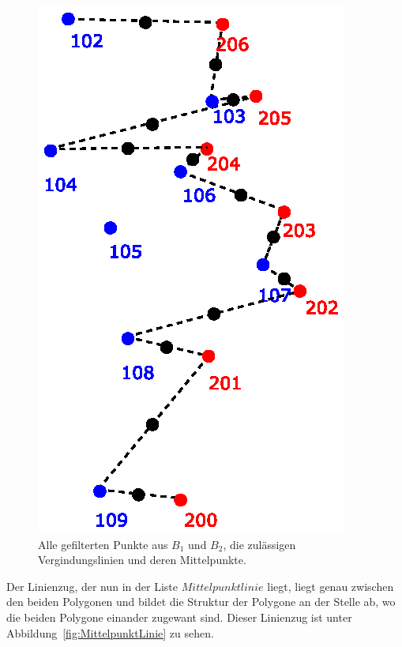 \begin{figure}
	\centering
	\includegraphics[scale=0.6]{Mittelpunkte.eps}
	\caption[Verbindungslinien und deren Mittelpunkte]{Alle gefilterten Punkte aus $B_1$ und $B_2$, die zulässigen Vergindungslinien und deren Mittelpunkte.}
	\label{fig:Mittelpunkte}
\end{figure}

Der Linienzug, der nun in der Liste $Mittelpunktlinie$ liegt, liegt genau zwischen den beiden Polygonen und bildet die Struktur der Polygone an der Stelle ab, wo die beiden Polygone einander zugewant sind. Dieser Linienzug ist unter Abbildung~\ref{fig:MittelpunktLinie} zu sehen.

